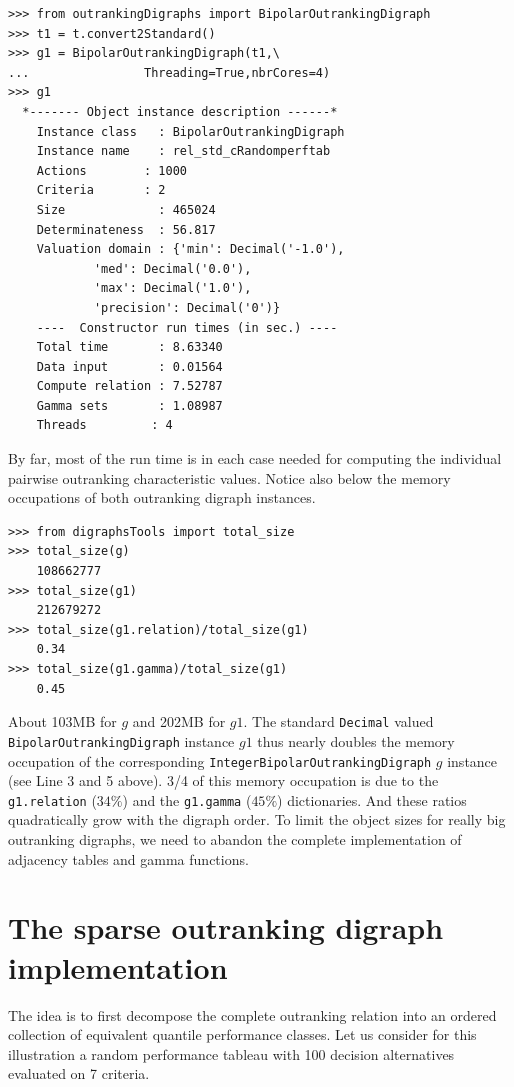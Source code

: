 \begin{lstlisting}
>>> from outrankingDigraphs import BipolarOutrankingDigraph
>>> t1 = t.convert2Standard()
>>> g1 = BipolarOutrankingDigraph(t1,\
...                Threading=True,nbrCores=4)
>>> g1
  *------- Object instance description ------*
    Instance class   : BipolarOutrankingDigraph
    Instance name    : rel_std_cRandomperftab
    Actions        : 1000
    Criteria       : 2
    Size             : 465024
    Determinateness  : 56.817
    Valuation domain : {'min': Decimal('-1.0'),
			'med': Decimal('0.0'),
			'max': Decimal('1.0'),
			'precision': Decimal('0')}
    ----  Constructor run times (in sec.) ----
    Total time       : 8.63340
    Data input       : 0.01564
    Compute relation : 7.52787
    Gamma sets       : 1.08987
    Threads         : 4
\end{lstlisting}

By far, most of the run time is in each case needed for computing the individual pairwise outranking characteristic values. Notice also below the memory occupations of both outranking digraph instances. 

\begin{lstlisting}
>>> from digraphsTools import total_size
>>> total_size(g)
    108662777
>>> total_size(g1)
    212679272
>>> total_size(g1.relation)/total_size(g1)
    0.34
>>> total_size(g1.gamma)/total_size(g1)
    0.45
\end{lstlisting}

About 103MB for $g$ and 202MB for $g1$. The standard \texttt{Decimal} valued \\
\texttt{BipolarOutrankingDigraph} instance $g1$ thus nearly doubles the memory\\ occupation of the corresponding \texttt{IntegerBipolarOutrankingDigraph} $g$ instance (see Line 3 and 5 above). 3/4 of this memory occupation is due to the \texttt{g1.relation} ($34\%$) and the \texttt{g1.gamma} ($45\%$) dictionaries. And these ratios quadratically grow with the digraph order. To limit the object sizes for really big outranking digraphs, we need to abandon the complete implementation of adjacency tables and gamma functions.

\section{The sparse outranking digraph implementation}
\label{sec:11.4}

The idea is to first decompose the complete outranking relation into an ordered collection of equivalent quantile performance classes. Let us consider for this illustration a random performance tableau with 100 decision alternatives evaluated on 7 criteria.

